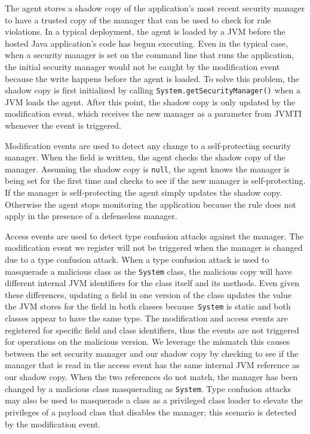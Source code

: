 \documentclass{sig-alternate}
\begin{document}
The agent stores a shadow copy of the application's most recent security
manager to have a trusted copy of the manager that can be used to
check for rule violations. In a typical deployment, the agent is loaded
by a JVM before the hosted Java application's code has begun executing.
Even in the typical case, when a security manager is set on the command
line that runs the application, the initial security manager would
not be caught by the modification event because the write happens
before the agent is loaded. To solve this problem, the shadow copy
is first initialized by calling \texttt{System.getSecurityManager()}
when a JVM loads the agent. After this point, the shadow copy is only
updated by the modification event, which receives the new manager
as a parameter from JVMTI whenever the event is triggered.

Modification events are used to detect any change to a self-protecting
security manager. When the field is written, the agent checks the
shadow copy of the manager. Assuming the shadow copy is \texttt{null},
the agent knows the manager is being set for the first time and checks
to see if the new manager is self-protecting. If the manager is self-protecting
the agent simply updates the shadow copy. Otherwise the agent stops monitoring the application because the rule does not apply in the presence of a defenseless manager.

Access events are used to detect type confusion attacks against the
manager. The modification event we register will not be triggered
when the manager is changed due to a type confusion attack. When a
type confusion attack is used to masquerade a malicious class as the
\texttt{System} class, the malicious copy will have different internal
JVM identifiers for the class itself and its methods. Even given these
differences, updating a field in one version of the class updates
the value the JVM stores for the field in both classes because\texttt{
System} is static and both classes appear to have the same type. The
modification and access events are registered for specific field and
class identifiers, thus the events are not triggered for operations
on the malicious version. We leverage the mismatch this causes between
the set security manager and our shadow copy by checking to see if
the manager that is read in the access event has the same internal
JVM reference as our shadow copy. When the two references do not match,
the manager has been changed by a malicious class masquerading as
\texttt{System}. Type confusion attacks may also be used to masquerade
a class as a privileged class loader to elevate the privileges of
a payload class that disables the manager; this scenario is detected
by the modification event.
\end{document}
